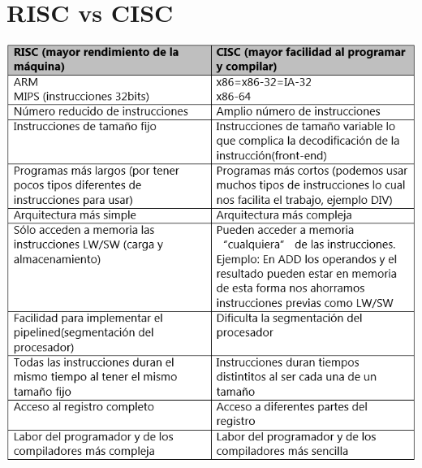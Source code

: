 \documentclass[11pt,letterpaper]{article}
\begin{document}
\section{RISC vs CISC}
\begin{center}
	\includegraphics[scale=0.9]{RISCvsCISC.png}
\end{center}
\end{document}
